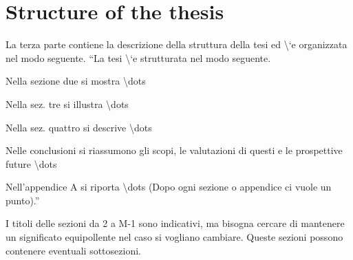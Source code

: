 \section{Structure of the thesis}

La terza parte contiene la descrizione della struttura della tesi
ed \textbackslash{}`e organizzata nel modo seguente. ``La tesi \textbackslash{}`e
strutturata nel modo seguente.

Nella sezione due si mostra \textbackslash{}dots

Nella sez. tre si illustra \textbackslash{}dots

Nella sez. quattro si descrive \textbackslash{}dots

Nelle conclusioni si riassumono gli scopi, le valutazioni di questi
e le prospettive future \textbackslash{}dots

Nell'appendice A si riporta \textbackslash{}dots (Dopo ogni sezione
o appendice ci vuole un punto).''

I titoli delle sezioni da 2 a M-1 sono indicativi, ma bisogna cercare
di mantenere un significato equipollente nel caso si vogliano cambiare.
Queste sezioni possono contenere eventuali sottosezioni.
